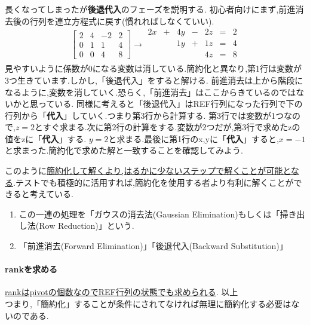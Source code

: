 長くなってしまったが\textbf{後退代入}のフェーズを説明する.
初心者向けにまず,前進消去後の行列を連立方程式に戻す(慣れればしなくていい).
\[
\begin{bmatrix}
    2& 4 & -2 & 2 \\
    0 & 1 & 1 & 4 \\
    0 & 0 & 4 & 8
\end{bmatrix}
\rightarrow
\begin{array}{ccccccc}
    2x & + &4y & -&2z &= &2 \\
       &  &1y & +&1z &= &4 \\
       &  &   &  &4z &= &8 \\
\end{array}
\]
見やすいように係数が0になる変数は消している.簡約化と異なり,第1行は変数が3つ生きています.しかし,「後退代入」をすると解ける.
前進消去は上から階段になるように,変数を消していく.恐らく,「前進消去」はここからきているのではないかと思っている.
同様に考えると「後退代入」はREF行列になった行列で下の行列から「\textbf{代入}」していく.つまり第3行から計算する.
第3行では変数が1つなので,$z=2$とすぐ求まる.次に第2行の計算をする.変数が2つだが,第3行で求めたzの値をzに「\textbf{代入}」する.
$y=2$と求まる.最後に第1行のx,yに「\textbf{代入}」すると,\;$x=-1$と求まった.簡約化で求めた解と一致することを確認してみよう.

このように\underline{簡約化して解くより,はるかに少ないステップで解くことが可能となる}.テストでも積極的に活用すれば,簡約化を使用する者より有利に解くことができると考えている.
\begin{enumerate}[label=※]
    \item この一連の処理を「ガウスの消去法(Gaussian Elimination)もしくは「掃き出し法(Row Reduction)」という.
    \item「前進消去(Forward Elimination)」「後退代入(Backward Substitution)」
\end{enumerate}
\paragraph{rankを求める}
\underline{rankはpivotの個数なのでREF行列の状態でも求められる}. 以上\\
つまり,「簡約化」することが条件にされてなければ無理に簡約化する必要はないのである.

